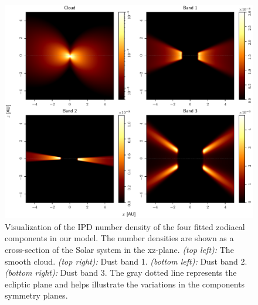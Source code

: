 \documentclass[twocolumn]{aa}
\begin{document}

\begin{figure}
    \centering
    \includegraphics[width=\textwidth]{figs/number_density.pdf}
    \caption{Visualization of the IPD number density of the four fitted zodiacal components in our model. The number densities are shown as a cross-section of the Solar system in the xz-plane. \textit{(top left):} The smooth cloud. \textit{(top right):} Dust band 1. \textit{(bottom left):} Dust band 2. \textit{(bottom right):} Dust band 3. The gray dotted line represents the ecliptic plane and helps illustrate the variations in the components symmetry planes.}
    \label{fig:ipd-number-density}
\end{figure}
\end{document}
